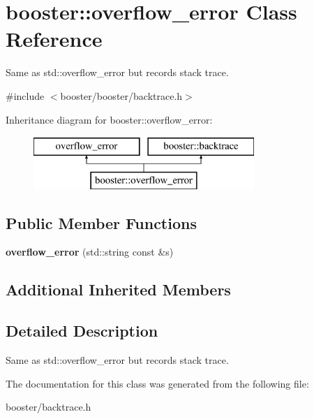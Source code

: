 \section{booster\-:\-:overflow\-\_\-error Class Reference}
\label{classbooster_1_1overflow__error}


Same as std\-::overflow\-\_\-error but records stack trace.  




{\ttfamily \#include $<$booster/booster/backtrace.\-h$>$}

Inheritance diagram for booster\-:\-:overflow\-\_\-error\-:\begin{figure}[H]
\begin{center}
\leavevmode
\includegraphics[height=2.000000cm]{classbooster_1_1overflow__error}
\end{center}
\end{figure}
\subsection*{Public Member Functions}
\begin{DoxyCompactItemize}
\item 
{\bfseries overflow\-\_\-error} (std\-::string const \&s)\label{classbooster_1_1overflow__error_afc09cb72a93db7b1002f757ab4d8e1ad}

\end{DoxyCompactItemize}
\subsection*{Additional Inherited Members}


\subsection{Detailed Description}
Same as std\-::overflow\-\_\-error but records stack trace. 

The documentation for this class was generated from the following file\-:\begin{DoxyCompactItemize}
\item 
booster/backtrace.\-h\end{DoxyCompactItemize}
